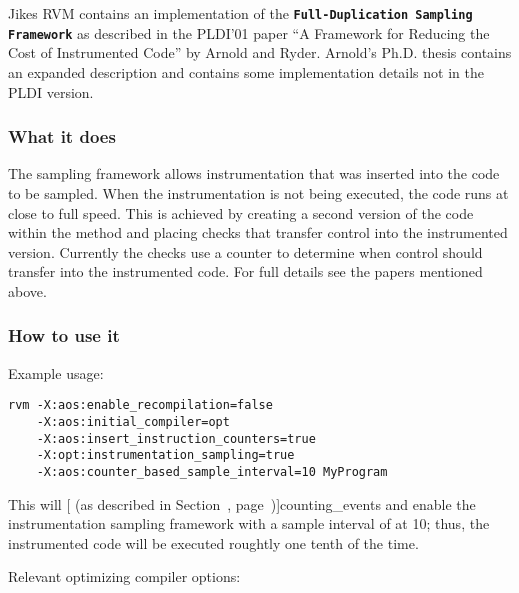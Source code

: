 Jikes RVM contains an implementation of the {\bf \tt Full-Duplication
Sampling Framework} as described in the PLDI'01 paper ``A Framework
for Reducing the Cost of Instrumented Code'' by Arnold and Ryder.
Arnold's Ph.D. thesis contains an expanded description and contains
some implementation details not in the PLDI version.


\subsubsection{What it does}

The sampling framework allows instrumentation that was inserted into
the code to be sampled.  When the instrumentation is not being
executed, the code runs at close to full speed.  This is achieved by
creating a second version of the code within the method and placing
checks that transfer control into the instrumented version.  Currently
the checks use a counter to determine when control should transfer
into the instrumented code.
For full details see the papers mentioned above. 

\T \pagebreak[4]
\subsubsection{How to use it}
\T \nopagebreak
Example usage: 
\T \nopagebreak
\begin{verbatim}
rvm -X:aos:enable_recompilation=false
    -X:aos:initial_compiler=opt
    -X:aos:insert_instruction_counters=true
    -X:opt:instrumentation_sampling=true
    -X:aos:counter_based_sample_interval=10 MyProgram
\end{verbatim}

This will [ (as described in
Section~\Ref, page~\Pageref)]{counting_events} and enable the instrumentation sampling
framework with a sample interval of at 10; thus, the instrumented code
will be executed roughtly one tenth of the time.   

Relevant optimizing compiler options:


